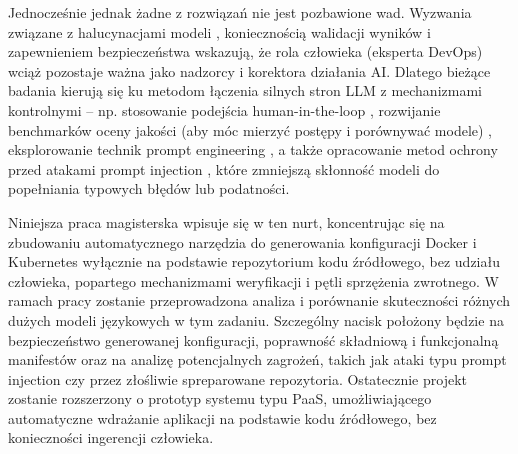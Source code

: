Jednocześnie jednak żadne z rozwiązań nie jest pozbawione wad. Wyzwania związane z halucynacjami modeli \cite{low_repairing_2024}, koniecznością walidacji wyników \cite{ueno_migrating_2024, kon_iac-eval_nodate} i zapewnieniem bezpieczeństwa \cite{malul_genkubesec_2024, fu_security_2025} wskazują, że rola człowieka (eksperta DevOps) wciąż pozostaje ważna jako nadzorcy i korektora działania AI. Dlatego bieżące badania kierują się ku metodom łączenia silnych stron LLM z mechanizmami kontrolnymi – np. stosowanie podejścia human-in-the-loop \cite{low_repairing_2024}, rozwijanie benchmarków oceny jakości (aby móc mierzyć postępy i porównywać modele) \cite{ueno_migrating_2024, kon_iac-eval_nodate}, eksplorowanie technik prompt engineering \cite{kratzke_dont_2024, pujar_invited_2023}, a także opracowanie metod ochrony przed atakami prompt injection \cite{liu_prompt_2024}, które zmniejszą skłonność modeli do popełniania typowych błędów lub podatności.

Niniejsza praca magisterska wpisuje się w ten nurt, koncentrując się na zbudowaniu automatycznego narzędzia do generowania konfiguracji Docker i Kubernetes wyłącznie na podstawie repozytorium kodu źródłowego, bez udziału człowieka, popartego mechanizmami weryfikacji i pętli sprzężenia zwrotnego. W ramach pracy zostanie przeprowadzona analiza i porównanie skuteczności różnych dużych modeli językowych w tym zadaniu. Szczególny nacisk położony będzie na bezpieczeństwo generowanej konfiguracji, poprawność składniową i funkcjonalną manifestów oraz na analizę potencjalnych zagrożeń, takich jak ataki typu prompt injection czy przez złośliwie spreparowane repozytoria. Ostatecznie projekt zostanie rozszerzony o prototyp systemu typu PaaS, umożliwiającego automatyczne wdrażanie aplikacji na podstawie kodu źródłowego, bez konieczności ingerencji człowieka.